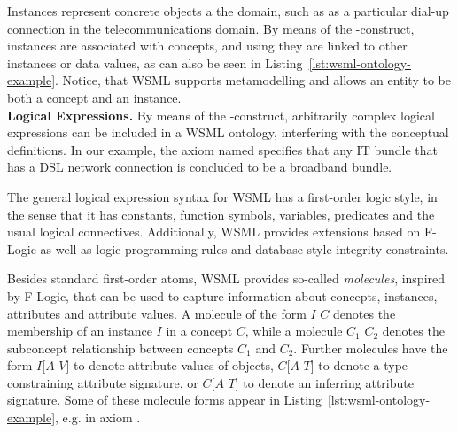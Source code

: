 Instances represent concrete objects a the domain, such as
 as a particular dial-up connection in the
telecommunications domain. By means of the
-construct, instances are associated with concepts,
and using  they are linked to other instances or
data values, as can also be seen in
Listing~\ref{lst:wsml-ontology-example}. Notice, that WSML
supports metamodelling and allows an entity to be both a concept
and an
instance.\\[2mm]
{\bfseries Logical Expressions.} By means of the
-construct, arbitrarily complex logical expressions can
be included in a WSML ontology, interfering with the conceptual
definitions. In our example, the axiom named
 specifies that any
IT bundle that has a DSL network connection is concluded to be a
broadband bundle.

The general logical expression syntax for WSML has a first-order
logic style, in the sense that it has constants, function symbols,
variables, predicates and the usual logical connectives.
Additionally, WSML provides extensions based on F-Logic
\cite{Kifer+LausenETAL-LogiFounObjeFram:95} as well as logic
programming rules and database-style integrity constraints.

Besides standard first-order atoms, WSML provides so-called
\emph{molecules}, inspired by F-Logic, that can be used to capture
information about concepts, instances, attributes and attribute
values. A molecule of the form $I$  $C$ denotes the
membership of an instance $I$ in a concept $C$, while a molecule
$C_1$  $C_2$ denotes the subconcept relationship
between concepts $C_1$ and $C_2$. Further molecules have the form
$I$[$A$  $V$] to denote attribute values of objects,
$C$[$A$  $T$] to denote a type-constraining attribute
signature, or $C$[$A$  $T$] to denote an inferring
attribute signature. Some of these molecule forms appear in
Listing~\ref{lst:wsml-ontology-example}, e.g. in axiom
.

